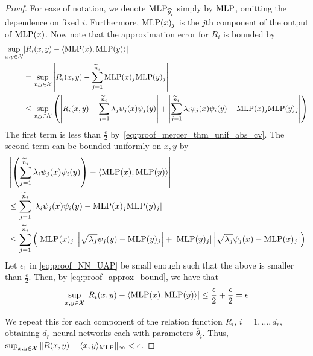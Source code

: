 \begin{proof}
	For ease of notation, we denote \(\text{MLP}_{\widehat{\theta}_i}\) simply by \(\text{MLP}\), omitting the dependence on fixed \(i\). Furthermore, \(\text{MLP}(x)_j\) is the \(j\)th component of the output of \(\text{MLP}(x)\). Now note that the approximation error for \(R_i\) is bounded by
	\begin{equation}
		\label{eq:proof_approx_bound}
		\begin{split}
			\sup_{x, y \in \mathcal{X}}&{
				\left\lvert R_i(x,y) - \langle \text{MLP}(x), \text{MLP}(y) \rangle \right\rvert}\\
			&= \sup_{x, y \in \mathcal{X}}{
				\left\lvert R_i(x,y) - \sum_{j=1}^{\widetilde{n}_i}{\text{MLP}(x)_j \text{MLP}(y)_j} \right\rvert} \\
			&\leq \sup_{x,y \in \mathcal{X}}{ \left(
				\left\lvert R_i(x,y) - \sum_{j=1}^{\widetilde{n}_i}{\lambda_j \psi_j(x) \psi_j(y)} \right\rvert
				+ \left\lvert \sum_{j=1}^{\widetilde{n}_i}{\lambda_i \psi_j(x) \psi_i(y) - \text{MLP}(x)_j \text{MLP}(y)_j} \right\rvert  \right) }
		\end{split}
	\end{equation}
	The first term is less than \(\frac{\epsilon}{2}\) by~\eqref{eq:proof_mercer_thm_unif_abs_cv}. The second term can be bounded uniformly on \(x,y\) by
	\begin{equation*}
		\begin{split}
			&\left\lvert \left(\sum_{j=1}^{\widetilde{n}_i}{\lambda_i \psi_j(x) \psi_i(y)}\right) - \langle \text{MLP}(x), \text{MLP}(y) \rangle \right\rvert  \\
			&\leq \sum_{j=1}^{\widetilde{n}_i}{ \left\lvert \lambda_i \psi_j(x) \psi_i(y) - \text{MLP}(x)_j \text{MLP}(y)_j \right\rvert} \\
			&\leq \sum_{j=1}^{\widetilde{n}_i}{\left(
				\left\lvert \text{MLP}(x)_j \right\rvert \left\lvert \sqrt{\lambda_j} \psi_j(y) - \text{MLP}(y)_j \right\rvert
				+ \lvert \text{MLP}(y)_j \rvert \left\lvert \sqrt{\lambda_j} \psi_j(x) - \text{MLP}(x)_j \right\rvert
				\right)}
		\end{split}
	\end{equation*}
	Let \(\epsilon_1\) in \eqref{eq:proof_NN_UAP} be small enough such that the above is smaller than \(\frac{\epsilon}{2}\). 	Then, by \eqref{eq:proof_approx_bound}, we have that
	\begin{equation*}
		\sup_{x, y \in \mathcal{X}}{
			\lvert R_i(x,y) - \langle \text{MLP}(x), \text{MLP}(y) \rangle \rvert} \leq \frac{\epsilon}{2} + \frac{\epsilon}{2} = \epsilon
	\end{equation*}

	We repeat this for each component of the relation function \(R_i\), \(i=1, \ldots, d_r\), obtaining \(d_r\) neural networks each with parameters \(\hat{\theta}_i\). Thus, \(\sup_{x,y \in \mathcal{X}}{\lVert R(x,y) - \langle x, y \rangle_{\text{MLP}} \rVert_\infty} < \epsilon\).
\end{proof}

